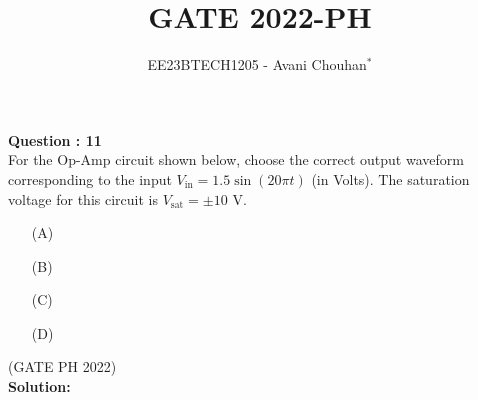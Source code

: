 \documentclass[journal,12pt,twocolumn]{IEEEtran}
\begin{document}

\vspace{3cm}

\title{GATE 2022-PH}
\author{EE23BTECH1205 - Avani Chouhan$^{*}$}
\maketitle
\bigskip

\renewcommand{\thefigure}{\theenumi}
\renewcommand{\thetable}{\theenumi}

\vspace{3cm}
\textbf{Question : 11} \\
For the Op-Amp circuit shown below, choose the correct output waveform corresponding to the input \( V_{\text{in}} = 1.5 \sin(20 \pi t) \) (in Volts). The saturation voltage for this circuit is \( V_{\text{sat}} = \pm 10 \) V.
\begin{figure}[ht]
\centering
    
\end{figure}
\begin{enumerate}
  \item[(A)]
  \begin{figure}[ht!]
    \centering
    
\end{figure}
  \item[(B)]  
  \begin{figure}[ht]
    \centering
    
\end{figure}
  \item[(C)] 
  \begin{figure}[ht]
    \centering
    
\end{figure}
  \item[(D)] 
   \begin{figure}[ht]
    \centering
    
\end{figure}
\end{enumerate}

\hfill{(GATE PH 2022)}\\
\textbf{Solution:} 
\fi
\end{document}
